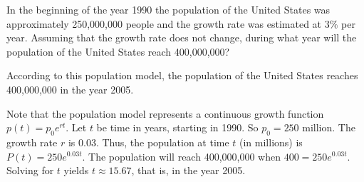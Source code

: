 \documentclass{ximera}
\begin{document}
\begin{exercise} \label{c3.1.10}
In the beginning of the year 1990 the population of the United States was
approximately 250,000,000 people and the growth rate was estimated at $3\%$
per year.  Assuming that the growth rate does not change, during what year
will the population of the United States reach 400,000,000?

\begin{solution}

\ans According to this population model, the population of the United States
reaches 400,000,000 in the year 2005.

\soln Note that the population model represents a continuous growth
function $p(t) = p_0e^{rt}$.  Let $t$ be time in years, starting in 1990. 
So $p_0 = 250$ million.  The growth rate $r$ is $0.03$.  Thus, the
population at time $t$ (in millions) is $P(t) = 250e^{0.03t}$.
The population will reach 400,000,000 when $400 = 250e^{0.03t}$.
Solving for $t$ yields $t \approx 15.67$, that is, in the year 2005.



\end{solution}
\end{exercise}
\end{document}
